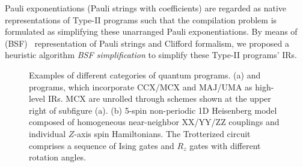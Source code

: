 Pauli exponentiations (Pauli strings with coefficients) are regarded as native representations of Type-II programs such that the compilation problem is formulated as simplifying these unarranged Pauli exponentiations. By means of  (BSF)~\cite{van2020circuit} representation of Pauli strings and Clifford formalism, we proposed a heuristic algorithm \textit{BSF simplification} to simplify these Type-II programs' IRs.



\begin{figure}[tbp]
    \centering
    \caption{Examples of different categories of quantum programs. (a)  and  programs, which incorporate $\mathrm{CCX}$/$\mathrm{MCX}$ and $\mathrm{MAJ}$/$\mathrm{UMA}$ as high-level IRs. $\mathrm{MCX}$ are unrolled through schemes shown at the upper right of subfigure (a).  (b) 5-spin non-periodic 1D Heisenberg model composed of homogeneous near-neighbor $\mathrm{XX}$/$\mathrm{YY}$/$\mathrm{ZZ}$ couplings and individual $Z$-axis spin Hamiltonians. The Trotterized circuit comprises a sequence of Ising gates and $R_z$ gates with different rotation angles.}
    \label{fig:program_example}
\end{figure}










